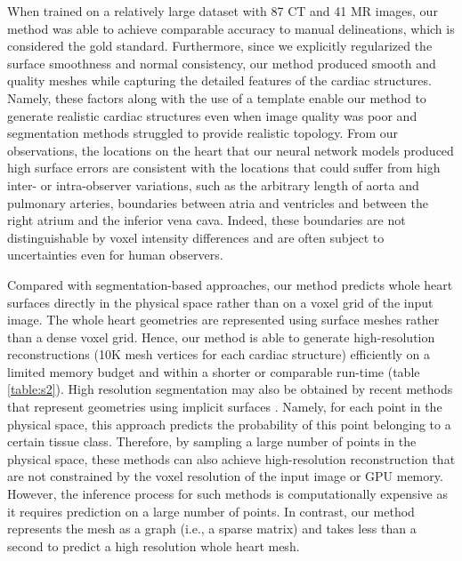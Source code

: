\documentclass[times,review,preprint,authoryear]{elsarticle}
\begin{document}
When trained on a relatively large dataset with 87 CT and 41 MR images, our method was able to achieve comparable accuracy to manual delineations, which is considered the gold standard. Furthermore, since we explicitly regularized the surface smoothness and normal consistency, our method produced smooth and quality meshes while capturing the detailed features of the cardiac structures. Namely, these factors along with the use of a template enable our method to generate realistic cardiac structures even when image quality was poor and segmentation methods struggled to provide realistic topology. From our observations, the locations on the heart that our neural network models produced high surface errors are consistent with the locations that could suffer from high inter- or intra-observer variations, such as the arbitrary length of aorta and pulmonary arteries, boundaries between atria and ventricles and between the right atrium and the inferior vena cava. Indeed, these boundaries are not distinguishable by voxel intensity differences and are often subject to uncertainties even for human observers. 

Compared with segmentation-based approaches, our method predicts whole heart surfaces directly in the physical space rather than on a voxel grid of the input image. The whole heart geometries are represented using surface meshes rather than a dense voxel grid. Hence, our method is able to generate high-resolution reconstructions (10K mesh vertices for each cardiac structure) efficiently on a limited memory budget and within a shorter or comparable run-time (table \ref{table:s2}). High resolution segmentation may also be obtained by recent methods that represent geometries using implicit surfaces \citep{kirillov2019pointrend}. Namely, for each point in the physical space, this approach predicts the probability of this point belonging to a certain tissue class. Therefore, by sampling a large number of points in the physical space, these methods can also achieve high-resolution reconstruction that are not constrained by the voxel resolution of the input image or GPU memory. However, the inference process for such methods is computationally expensive \citep{NeuralMeshFlow} as it requires prediction on a large number of points. In contrast, our method represents the mesh as a graph (i.e., a sparse matrix) and takes less than a second to predict a high resolution whole heart mesh. 
\end{document}
